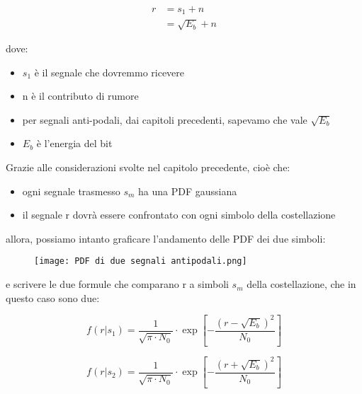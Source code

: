 {
    \Large 
    \begin{equation}
        \begin{split}
            r 
            &= 
            s_1 + n 
            \\
            &= 
            \sqrt{E_b} + n
        \end{split}
    \end{equation}
}

dove: 

\begin{itemize}
    \item $s_1$ è il segnale che dovremmo ricevere 
    \item n è il contributo di rumore 
    \item per segnali anti-podali, dai capitoli precedenti, sapevamo che vale $\sqrt{E_b}$ 
    \item $E_b$ è l'energia del bit
\end{itemize}

\newpage 

Grazie alle considerazioni svolte nel capitolo precedente, cioè che: 

\begin{itemize}
    \item ogni segnale trasmesso $s_m$ ha una PDF gaussiana 
    \item il segnale r dovrà essere confrontato con ogni simbolo della costellazione
\end{itemize}

allora, possiamo intanto graficare l'andamento delle PDF dei due simboli: 

\begin{figure}[h]
    \centering
    \texttt{[image: PDF di due segnali antipodali.png]}
\end{figure}

e scrivere le due formule che comparano r a simboli $s_m$ della costellazione, che in questo caso sono due: 

{
    \Large 
    \begin{equation}
        f (r | s_1)
        = 
        \frac{1}{\sqrt{\pi \cdot N_0}}
        \cdot 
        \exp
        \left[
        - 
        \frac{(r - \sqrt{E_b})^{2}}{N_0}
        \right]
    \end{equation}
}

{
    \Large 
    \begin{equation}
        f (r | s_2)
        = 
        \frac{1}{\sqrt{\pi \cdot N_0}}
        \cdot 
        \exp
        \left[
        - 
        \frac{(r + \sqrt{E_b})^{2}}{N_0}
        \right]
    \end{equation}
}

